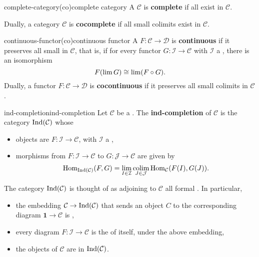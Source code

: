 \begin{topic}{complete-category}{(co)complete category}
    A  $\mathcal{C}$ is \textbf{complete} if all   exist in $\mathcal{C}$.
    
    Dually, a category $\mathcal{C}$ is \textbf{cocomplete} if all small colimits exist in $\mathcal{C}$.
\end{topic}

\begin{topic}{continuous-functor}{(co)continuous functor}
    A  $F : \mathcal{C} \to \mathcal{D}$ is \textbf{continuous} if it preserves all small  in $\mathcal{C}$, that is, if for every functor $G : \mathcal{I} \to \mathcal{C}$ with $\mathcal{I}$ a , there is an isomorphism
    \[ F(\lim G) \cong \lim(F \circ G) . \]
    Dually, a functor $F : \mathcal{C} \to \mathcal{D}$ is \textbf{cocontinuous} if it preserves all small colimits in $\mathcal{C}$.
\end{topic}

\begin{topic}{ind-completion}{ind-completion}
    Let $\mathcal{C}$ be a . The \textbf{ind-completion} of $\mathcal{C}$ is the category $\textup{Ind}(\mathcal{C})$ whose
    \begin{itemize}
        \item objects are  $F : \mathcal{I} \to \mathcal{C}$, with $\mathcal{I}$ a  ,
        \item morphisms from $F : \mathcal{I} \to \mathcal{C}$ to $G : \mathcal{J} \to \mathcal{C}$ are given by
        \[ \operatorname{Hom}_{\textup{Ind}(\mathcal{C})}(F, G) = \lim_{I \in \mathcal{I}} \operatorname*{colim}_{J \in \mathcal{J}} \operatorname{Hom}_\mathcal{C}(F(I), G(J)) . \]
    \end{itemize}
    The category $\textup{Ind}(\mathcal{C})$ is thought of as adjoining to $\mathcal{C}$ all formal . In particular,
    \begin{itemize}
        \item the embedding $\mathcal{C} \to \textup{Ind}(\mathcal{C})$ that sends an object $C$ to the corresponding diagram $\textbf{1} \to \mathcal{C}$ is  ,
        \item every diagram $F : \mathcal{I} \to \mathcal{C}$ is the  of itself, under the above embedding,
        \item the objects of $\mathcal{C}$ are  in $\textup{Ind}(\mathcal{C})$.
    \end{itemize}
\end{topic}

